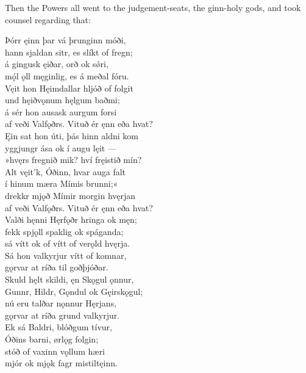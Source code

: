 \bvb Then the Powers all went to the judgement-seats, the ginn-holy gods, and took counsel regarding that:

\bva Þórr ęinn þar vá \hld þrunginn móði, \\%
hann sjaldan sitr, \hld es slíkt of fregn; \\%
á gingusk ęiðar, \hld orð ok sǿri, \\%
mǫ́l ǫll męginlig, \hld es á meðal fóru.\\%

\bva Vęit hon Hęimdallar \hld hljóð of folgit \\%
und hęiðvǫnum \hld hęlgum baðmi; \\%
á sér hon ausask \hld aurgum forsi \\%
af veði Valfǫðrs. \hld Vituð ér ęnn eða hvat?\\%

\bva Ęin sat hon úti, \hld þás hinn aldni kom \\%
yggjungr ása \hld ok í augu lęit — \\%
»hvęrs fregnið mik? \hld hví fręistið mín? \\%
Alt vęit'k, Óðinn, \hld hvar auga falt \\%
í hinum mæra \hld Mímis brunni;« \\%
drekkr mjǫð Mímir \hld morgin hvęrjan \\%
af veði Valfǫðrs. \hld Vituð ér ęnn eða hvat?\\%

\bva Valði hęnni Hęrfǫðr \hld hringa ok męn; \\%
fekk spjǫll spaklig \hld ok spáganda; \\%
sá vítt ok of vítt \hld of verǫld hvęrja.\\%

\bva Sá hon valkyrjur \hld vítt of komnar, \\%
gǫrvar at ríða \hld til goðþjóðar. \\%
Skuld hęlt skildi, \hld ęn Skǫgul ǫnnur, \\%
Gunnr, Hildr, Gǫndul \hld ok Gęirskǫgul; \\%
nú eru talðar \hld nǫnnur Hęrjans, \\%
gǫrvar at ríða \hld grund valkyrjur.\\%

\bva Ek sá Baldri, \hld blóðgum tívur, \\%
Óðins barni, \hld ørlǫg folgin; \\%
stóð of vaxinn \hld vǫllum hæri \\%
mjór ok mjǫk fagr \hld mistiltęinn.\\%

